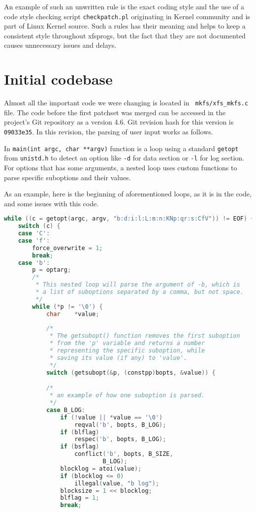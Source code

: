 An example of such an unwritten rule is the exact coding style and the use of
a code style checking script {\tt checkpatch.pl} originating in Kernel
community and is part of Linux Kernel source. Such a rules has their
meaning and helps to keep a consistent style throughout xfsprogs, but the
fact that they are not documented causes unnecessary issues and delays.

\section{Initial codebase}\label{chap:refactoring:initialcodebase}

Almost all the important code we were changing is located in {\tt
mkfs/xfs\_mkfs.c} file. The code before the first patchset was merged can
be accessed in the project's Git repository as a version 4.6. Git revision
hash for this version is {\tt 09033e35}. In this revision, the parsing of
user input works as follows.

In {\tt main(int argc, char **argv)} function is a loop using a standard
{\tt getopt} from {\tt unistd.h} to detect an option like {\tt -d} for data
section or {\tt -l} for log section. For options that has some arguments, a
nested loop uses custom functions to parse specific suboptions and their
values.

As an example, here is the beginning of aforementioned loops, as it is in
the code, and some issues with this code.

\begin{lstlisting}[frame=none, basicstyle=\footnotesize\ttfamily,
language=C, numbers=none, numberstyle=\tiny\color{black},
caption= {Part of option-parsing loop from mkfs.xfs with additional
comments.},
label={lst:refactoring:loopexample}]
while ((c = getopt(argc, argv, "b:d:i:l:L:m:n:KNp:qr:s:CfV")) != EOF) {
	switch (c) {
	case 'C':
	case 'f':
		force_overwrite = 1;
		break;
	case 'b':
		p = optarg;
		/*
		 * This nested loop will parse the argument of -b, which is
		 * a list of suboptions separated by a comma, but not space.
		 */
		while (*p != '\0') {
			char	*value;
			
			/*
			 * The getsubopt() function removes the first suboption
			 * from the 'p' variable and returns a number
			 * representing the specific suboption, while
			 * saving its value (if any) to 'value'.
			 */
			switch (getsubopt(&p, (constpp)bopts, &value)) {

			/*
			 * an example of how one suboption is parsed.
			 */
			case B_LOG:
				if (!value || *value == '\0')
					reqval('b', bopts, B_LOG);
				if (blflag)
					respec('b', bopts, B_LOG);
				if (bsflag)
					conflict('b', bopts, B_SIZE,
							B_LOG);
				blocklog = atoi(value);
				if (blocklog <= 0)
					illegal(value, "b log");
				blocksize = 1 << blocklog;
				blflag = 1;
				break;
\end{lstlisting}

